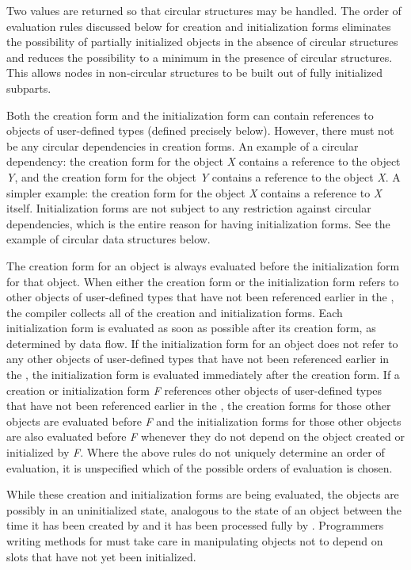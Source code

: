 \begin{newer}
\begin{defun}
  Two values are returned so that circular structures may be handled.
  The order of evaluation rules discussed below
  for creation and initialization forms
  eliminates the possibility of partially initialized objects in the
  absence of circular structures and reduces the possibility to a minimum
  in the presence of circular structures.  This allows nodes in
  non-circular structures to be built out of fully initialized subparts.

  Both the creation form and the initialization form can contain
  references to objects of user-defined types (defined precisely below).
  However, there must not be any circular dependencies in creation forms.
  An example of a circular dependency: the creation form for the
  object {\it X\/} contains a reference to the object {\it Y\/}, and the creation form
  for the object {\it Y\/} contains a reference to the object {\it X\/}.  A simpler
  example: the creation form for the object {\it X\/} contains
  a reference to {\it X\/} itself.  Initialization forms are not subject to
  any restriction against circular dependencies, which is the entire
  reason for having initialization forms.  See the example of circular
  data structures below.

  The creation form for an object is always evaluated before the
  initialization form for that object.  When either the creation form or
  the initialization form refers to other objects of user-defined types
  that have not been referenced earlier in the , the
  compiler collects all of the creation and initialization forms.  Each
  initialization form is evaluated as soon as possible after its
  creation form, as determined by data flow.  If the initialization form
  for an object does not refer to any other objects of user-defined
  types that have not been referenced earlier in the , the
  initialization form is evaluated immediately after the creation form.
  If a creation or initialization form {\it F\/} references other objects of
  user-defined types that have not been referenced earlier in the
  , the creation forms for those other objects are evaluated
  before {\it F\/} and the initialization forms for those other objects are
  also evaluated before {\it F\/} whenever they do not depend on the object
  created or initialized by {\it F}.  Where the above rules do not uniquely
  determine an order of evaluation, it is unspecified
  which of the possible orders of evaluation is chosen.

  While these creation and initialization forms are being evaluated, the
  objects are possibly in an uninitialized state, analogous to the state
  of an object between the time it has been created by 
  and it has been processed fully by .  Programmers
  writing methods for  must take care in manipulating
  objects not to depend on slots that have not yet been initialized.


\end{defun}
\end{newer}

